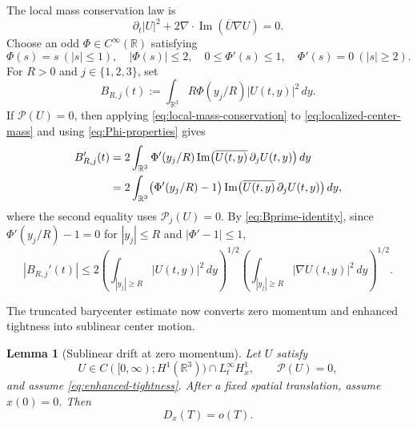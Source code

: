 \documentclass[preprint,12pt]{elsarticle}
\numberwithin{equation}{section}
\newtheorem{lemma}[theorem]{Lemma}
\theoremstyle{remark}
\newcommand{\R}{\mathbb R}
\newcommand{\dd}{\,d}
\newcommand{\Pcal}{\mathcal P}
\begin{document}
The local mass conservation law is
\begin{equation}\label{eq:local-mass-conservation}
  \partial_t|U|^2+2\nabla\cdot\operatorname{Im}(\overline U\nabla U)=0.
\end{equation}
Choose an odd $\Phi\in C^\infty(\R)$ satisfying
\begin{equation}\label{eq:Phi-properties}
  \Phi(s)=s\ (|s|\le1),
  \quad |\Phi(s)|\le2,
  \quad 0\le\Phi'(s)\le1,
  \quad \Phi'(s)=0\ (|s|\ge2).
\end{equation}
For $R>0$ and $j\in\{1,2,3\}$, set
\begin{equation}\label{eq:localized-center-mass}
  B_{R,j}(t):=\int_{\R^3}R\Phi(y_j/R)|U(t,y)|^2\dd y.
\end{equation}
If $\Pcal(U)=0$, then applying \eqref{eq:local-mass-conservation} to \eqref{eq:localized-center-mass} and using \eqref{eq:Phi-properties} gives
\begin{align}
  B_{R,j}'(t)
  &=2\int_{\R^3}\Phi'(y_j/R)
  \operatorname{Im}\bigl(\overline{U(t,y)}\,\partial_jU(t,y)\bigr)\dd y\notag\\
  &=2\int_{\R^3}\bigl(\Phi'(y_j/R)-1\bigr)
  \operatorname{Im}\bigl(\overline{U(t,y)}\,\partial_jU(t,y)\bigr)\dd y,
  \label{eq:Bprime-identity}
\end{align}
where the second equality uses $\Pcal_j(U)=0$. By \eqref{eq:Bprime-identity}, since $\Phi'(y_j/R)-1=0$ for $|y_j|\le R$ and $|\Phi'-1|\le1$,
\begin{equation}\label{eq:Bprime-tail}
  |B_{R,j}'(t)|
  \le2
  \left(\int_{|y_j|\ge R}|U(t,y)|^2\dd y\right)^{1/2}
  \left(\int_{|y_j|\ge R}|\nabla U(t,y)|^2\dd y\right)^{1/2}.
\end{equation}

The truncated barycenter estimate now converts zero momentum and enhanced tightness into sublinear center motion.

\begin{lemma}[Sublinear drift at zero momentum]\label{lem:sublinear-drift}
Let $U$ satisfy
\begin{equation*}
  U\in C([0,\infty);H^1(\R^3))\cap L_t^\infty H_x^1,
  \qquad \Pcal(U)=0,
\end{equation*}
and assume \eqref{eq:enhanced-tightness}. After a fixed spatial translation, assume $x(0)=0$. Then
\begin{equation}\label{eq:sublinear-drift}
  D_x(T)=o(T).
\end{equation}
\end{lemma}
\end{document}
